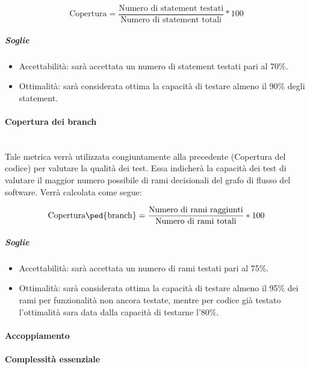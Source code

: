 	\begin{displaymath}
		\mbox{Copertura} =\frac{\mbox{Numero di statement testati}}{\mbox{Numero di statement totali}} * 100
	\end{displaymath}	
	
\subparagraph{Soglie}
	\begin{itemize}
	\item Accettabilità: sarà accettata un numero di statement testati pari al 70\%.
	\item Ottimalità: sarà considerata ottima la capacità di testare almeno il 90\% degli statement.
	\end{itemize}
	

\paragraph{Copertura dei branch}
	~\\Tale metrica verrà utilizzata congiuntamente alla precedente (Copertura del codice) per valutare la qualità dei test. Essa indicherà la capacità dei test di valutare il maggior numero possibile di rami decisionali del grafo di flusso del software. Verrà calcolata come segue:

	\begin{displaymath}
		\mbox{Copertura\ped{branch}} =\frac{\mbox{Numero di rami raggiunti}}{\mbox{Numero di rami totali}} * 100
	\end{displaymath}	
	
	\subparagraph{Soglie}
	\begin{itemize}
	\item Accettabilità: sarà accettata un numero di rami testati pari al 75\%.
	\item Ottimalità: sarà considerata ottima la capacità di testare almeno il 95\% dei rami per funzionalità non ancora testate, mentre per codice già testato l'ottimalità sara data dalla capacità di testarne l'80\%.
	\end{itemize}


\paragraph{Accoppiamento}


\paragraph{Complessità essenziale}

